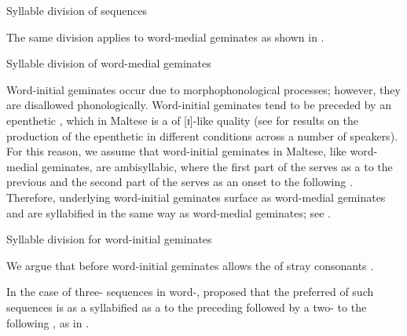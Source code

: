 \documentclass[output=paper]{langsci/langscibook}
\begin{document}
\ea\label{ex:galea:9}
{Syllable division of  sequences} \\
\z
\z

The same  division applies to word-medial geminates as shown in .

\ea\label{ex:galea:10}
{Syllable division of word-medial geminates}\\
\z
\z

Word-initial geminates occur due to morphophonological processes; however, they are disallowed phonologically. Word-initial geminates tend to be preceded by an epenthetic , which in Maltese is a  of [ɪ]-like quality (see \citealt{lukediss} for results on the production of the epenthetic  in different conditions across a number of speakers). For this reason, we assume that word-initial geminates in Maltese, like word-medial geminates, are ambisyllabic, where the first part of the  serves as a  to the previous  and the second part of the  serves as an onset to the following . Therefore, underlying word-initial geminates surface as word-medial geminates and are syllabified in the same way as word-medial geminates; see . 

\largerpage
\ea\label{ex:galea:11}
{Syllable division for word-initial geminates}\\
\z
\z

We argue that   before word-initial geminates allows the  of stray consonants \citep{ito1986,ito1989}. 

In the case of three- sequences in word-, \citet{azzopardi1981phonetics} proposed that the preferred  of such sequences is as a  syllabified as a  to the preceding  followed by a two-  to the following , as in .
\end{document}
